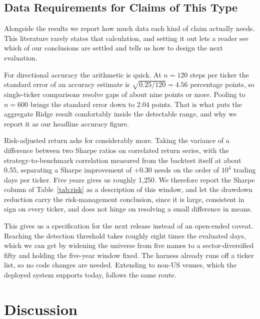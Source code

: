 \documentclass[conference]{IEEEtran}
\begin{document}
\subsection{Data Requirements for Claims of This Type}
\label{sec:power}

Alongside the results we report how much data each kind of claim actually needs. This literature rarely states that calculation, and setting it out lets a reader see which of our conclusions are settled and tells us how to design the next evaluation.

For directional accuracy the arithmetic is quick. At $n=120$ steps per ticker the standard error of an accuracy estimate is $\sqrt{0.25/120}=4.56$ percentage points, so single-ticker comparisons resolve gaps of about nine points or more. Pooling to $n=600$ brings the standard error down to 2.04 points. That is what puts the aggregate Ridge result comfortably inside the detectable range, and why we report it as our headline accuracy figure.

Risk-adjusted return asks for considerably more. Taking the variance of a difference between two Sharpe ratios on correlated return series, with the strategy-to-benchmark correlation measured from the backtest itself at about 0.55, separating a Sharpe improvement of $+0.30$ needs on the order of $10^{4}$ trading days per ticker. Five years gives us roughly 1{,}250. We therefore report the Sharpe column of Table~\ref{tab:risk} as a description of this window, and let the drawdown reduction carry the risk-management conclusion, since it is large, consistent in sign on every ticker, and does not hinge on resolving a small difference in means.

This gives us a specification for the next release instead of an open-ended caveat. Reaching the detection threshold takes roughly eight times the evaluated days, which we can get by widening the universe from five names to a sector-diversified fifty and holding the five-year window fixed. The harness already runs off a ticker list, so no code changes are needed. Extending to non-US venues, which the deployed system supports today, follows the same route.

\section{Discussion}
\label{sec:discussion}
\end{document}
